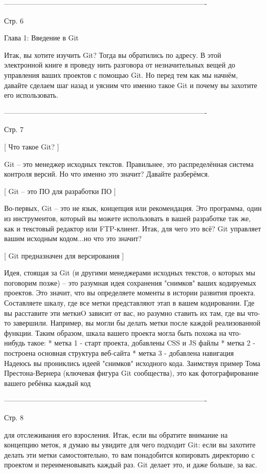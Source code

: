 -------------------------------------------------------------------------------------

Стр. 6

Глава 1: Введение в Git

Итак, вы хотите изучить Git? Тогда вы обратились по адресу. В этой электронной книге
я проведу нить разговора от незначительных вещей до управления ваших проектов с
помощью Git. Но перед тем как мы начнём, давайте сделаем шаг назад и уясним что
именно такое Git и почему вы захотите его использовать.

-------------------------------------------------------------------------------------

Стр. 7

[ Что такое Git? ]

Git -- это менеджер исходных текстов. Правильнее, это распределённая система
контроля версий. Но что именно это значит? Давайте разберёмся.

[ Git -- это ПО для разработки ПО ]

Во-первых, Git -- это не язык, концепция или рекомендация. Это программа, один из
инструментов, который вы можете использовать в вашей разработке так же, как и 
текстовый редактор или FTP-клиент. Итак, для чего это всё? Git управляет вашим 
исходным кодом...но что это значит?

[ Git предназначен для версирования ]

Идея, стоящая за Git (и другими менеджерами исходных текстов, о которых мы поговорим
позже) -- это разумная идея сохранения "снимков" ваших кодируемых проектов. Это 
значит, что вы определяете моменты в истории развития проекта. Составляете шкалу,
где все метки представляют этап в вашем кодировании. Где вы расставите эти меткиO
зависит от вас, но разумно ставить их там, где вы что-то завершили. Например, вы
могли бы делать метки после каждой реализованной функции. Таким образом, шкала
вашего проекта могла быть похожа на что-нибудь такое:
    * метка 1 - старт проекта, добавлены CSS и JS файлы
    * метка 2 - построена основная структура веб-сайта
    * метка 3 - добавлена навигация
Надеюсь вы прониклись идеей "снимков" исходного кода. Заимствуя пример Тома
Престона-Вернера (ключевая фигура Git сообщества), это как фотографирование вашего
ребёнка каждый код 

-------------------------------------------------------------------------------------

Стр. 8

для отслеживания его взросления. Итак, если вы обратите внимание
на концепцию меток, я думаю вы увидите для чего подходит Git: если вы захотите делать
эти метки самостоятельно, то вам понадобится копировать директорию с проектом и
переименовывать каждый раз. Git делает это, и даже больше, за вас.

